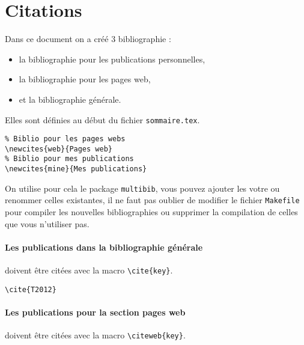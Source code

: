 \section{Citations}

Dans ce document on a créé 3 bibliographie :
\begin{itemize}
  \item la bibliographie pour les publications personnelles,
  \item la bibliographie pour les pages web,
  \item et la bibliographie générale.
\end{itemize}

Elles sont définies au début du fichier \texttt{sommaire.tex}.

\begin{framed}
\begin{verbatim}
% Biblio pour les pages webs
\newcites{web}{Pages web}
% Biblio pour mes publications
\newcites{mine}{Mes publications}
\end{verbatim}\vspace{-0.5em}
\end{framed}

On utilise pour cela le package \texttt{multibib}, vous pouvez ajouter les votre ou renommer celles existantes, il ne faut pas oublier de modifier le fichier \texttt{Makefile} pour compiler les nouvelles bibliographies ou supprimer la compilation de celles que vous n'utiliser pas.

\paragraph{Les publications dans la bibliographie générale} doivent être citées avec la macro \texttt{\textbackslash cite\{key\}}.

\begin{framed}
\noindent\cite{T2012}\vspace{-0.5em}
\begin{verbatim}\cite{T2012}\end{verbatim}\vspace{-0.75em}
\end{framed}

\paragraph{Les publications pour la section pages web} doivent être citées avec la macro \texttt{\textbackslash citeweb\{key\}}.

